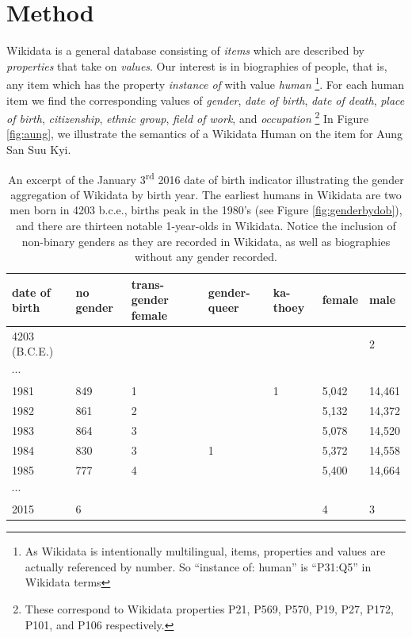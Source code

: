 \documentclass{sig-alternate-05-2015}
\begin{document}
\section{Method}

Wikidata is a general database consisting of \textit{items} which are described by \textit{properties} that take on \textit{values}. Our interest is in biographies of people, that is, any item which has the property \textit{instance of} with value \textit{human} \footnote{As Wikidata is intentionally multilingual, items, properties and values are actually referenced by number. So ``instance of: human'' is ``P31:Q5'' in Wikidata terms }. For each human item we find the corresponding values of \textit{gender}, \textit{date of birth}, \textit{date of death}, \textit{place of birth}, \textit{citizenship}, \textit{ethnic group}, \textit{field of work}, and \textit{occupation} \footnote{These correspond to Wikidata properties P21, P569, P570, P19, P27, P172, P101, and P106 respectively.} In Figure \ref{fig:aung}, we illustrate the semantics of a Wikidata Human on the item for Aung San Suu Kyi.
 
\begin{table}
\caption{An excerpt of the January 3\textsuperscript{rd} 2016 date of birth indicator illustrating the gender aggregation of Wikidata by birth year. The earliest humans in Wikidata are two men born in 4203 b.c.e., births peak in the 1980's (see Figure \ref{fig:genderbydob}), and there are thirteen notable 1-year-olds in Wikidata. Notice the inclusion of non-binary genders as they are recorded in Wikidata, as well as biographies without any gender recorded.}
\begin{tabular} {p{0.75cm}p{0.75cm}p{0.75cm}p{0.75cm}p{0.75cm}p{0.75cm}p{0.75cm}}
\toprule
date of birth & no gender & trans-gender female & gender-queer & ka-thoey & female & male \\
\midrule
4203 \small{(B.C.E.)} & & & & & & 2   \\ 
$\cdots$ &  &  &  & &  &    \\ 
1981 & 849 & 1 &  & 1 &5,042 & 14,461 \\ 
1982 & 861 & 2 &  & &5,132 & 14,372  \\ 
1983 & 864 & 3 &  & &5,078 & 14,520  \\ 
1984 & 830 & 3 & 1 & &5,372 & 14,558   \\ 
1985 & 777 & 4 &  & &5,400 & 14,664  \\ 
$\cdots$ &  &  &  & &  &    \\ 
2015 & 6 &  &  & & 4 & 3  \\ 
\bottomrule
\end{tabular}
\label{table:dob}
\end{table}
\end{document}
